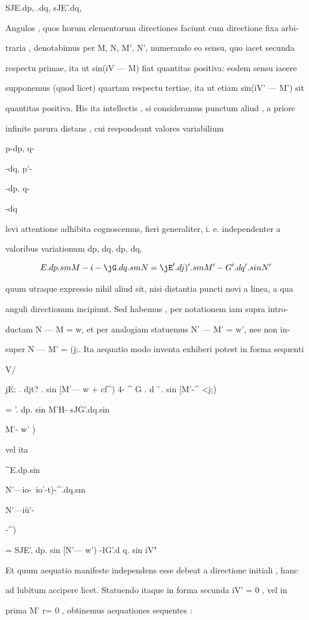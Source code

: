 \documentclass[12pt,a4paper]{article}
\begin{document}
{{{{{{{{{{SJE.dp,       \JG.dq,       sJE'.dq,       \JG\dq

Angulos ,  quos  horum  elementorum  directiones  faciunt  cum  directione  fixa  arbi-

traria ,  denotabimus  per  M,  N,  M',  N',  numerando  eo  sensu,  quo  iacet  secunda

respectu  primae,  ita  ut  sin(iV — M)  fiat  quantitas  positiva:  eodem  sensu  iaeere

supponemus  (quod  licet)  quartam  respectu  tertiae,  ita  ut  etiam  sin(iV' — M')  sit

quantitas  positiva.  His  ita  intellectis ,  si  consideramus  punctum  aliud ,  a  priore

infinite  parura  distans ,  cui  respondeant  valores  variabilium

p-\-dp,       q-{-dq,      p'-{-dp,       q-{-dq

levi  attentione  adhibita  cognoscemus,  fieri  generaliter,  i.  e.  independenter  a

valoribus  variationum    dp,  dq,  dp,  dq,

\[
\/E.dp.smM-i-\jG.dq.smN  =  \jE'.dj)'.  smM'-\-\/ G'.dq'.sinN' \\
\]

quum  utraque  expressio  nihil  aliud  sit,  nisi  distantia  puncti  novi  a  linea,  a  qua

anguli  directionum  incipiunt.  Sed  habemus ,  per  notationem  iam  supra  intro-

ductam  N — M  =  w,  et  per  analogiam  statuemus  N' — M'  =  w',  nee  non  in-

super  N —  M'  =  (j;.    Ita  aequatio  modo  inventa  exhiberi  potest  in  forma  sequenti

V/

jE;  .  djt? .  sin  [M'—  w  +  cf^)  4-  ^  G .  d  ^^ .  sin  [M'-^  <j;)

=  \JE'. dp.  sin  M'H-  sJG'.dq.sin  {M'-\-  w' )

vel  ita

^E.dp.sin{N'—io-~io'-\-t\>)-^\jG.dq.sm{N'—iü'-{-^)

=  SJE'. dp.  sin [N'—  w') -\-\l G'.d q.  sin iV"

Et  quum  aequatio  manifeste  independens  esse  debeat  a  directione  initiali ,  hanc

ad  lubitum  accipere  licet.  Statuendo  itaque  in  forma  secunda  iV'  =  0  ,  vel  in

prima   M'  r=  0 ,    obtinemus  aequationes  sequentes :

}}}}}}}}}}}}}}}}}
\end{document}

